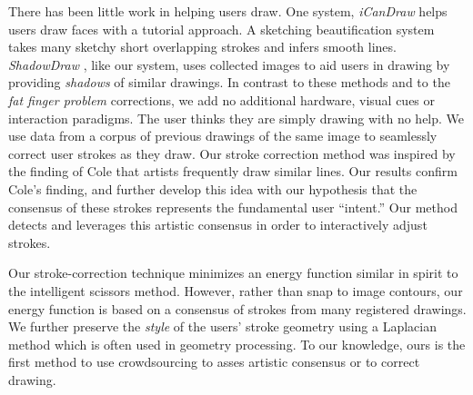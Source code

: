 There has been little work in helping users draw. One system, \emph{iCanDraw}\cite{Dixon:2010:IUS} helps users draw faces with a tutorial approach. A sketching beautification system~\cite{Orbay2011} takes many sketchy short overlapping strokes and infers smooth lines. \emph{ShadowDraw} \cite{Lee:2011}, like our system, uses collected images to aid users in drawing by providing {\em shadows} of similar drawings.  In contrast to these methods and to the \emph{fat finger problem} corrections, we add no additional hardware, visual cues or interaction paradigms. The user thinks they are simply drawing with no help. We use data from a corpus of previous drawings of the same image to seamlessly correct user strokes as they draw. Our stroke correction method was inspired by the finding of Cole \etal {} that artists frequently draw similar lines. Our results confirm Cole's finding, and further develop this idea with our hypothesis that the consensus of these strokes represents the fundamental user ``intent.'' Our method detects and leverages this artistic consensus in order to
interactively adjust strokes.

Our stroke-correction technique minimizes an energy function similar
in spirit to the intelligent scissors
method\cite{Mortensen:1995:ISF}. However, rather than snap to image
contours, our energy function is based on a consensus of strokes from many
registered drawings. We further preserve the {\em style} of the
users' stroke geometry using a Laplacian method which is often used
in geometry processing\cite{Sorkine:2004:LSE}. To our knowledge,
ours is the first method to use crowdsourcing to asses artistic
consensus or to correct drawing.

